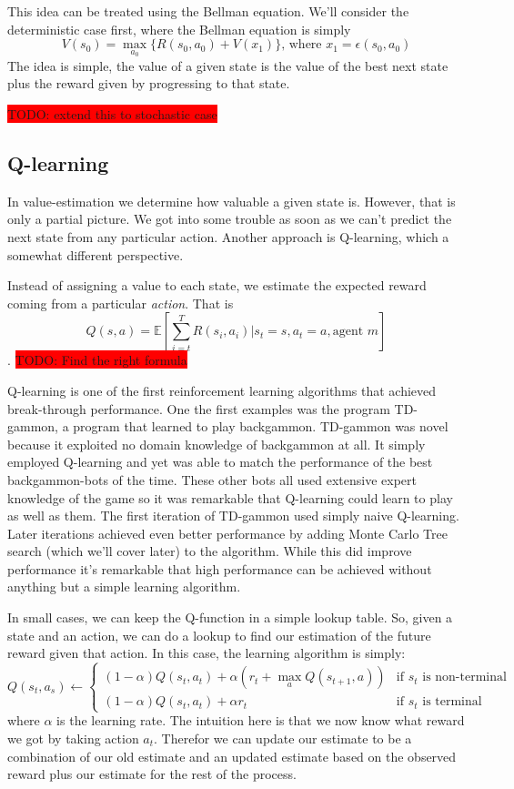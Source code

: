 \documentclass{article}
\theoremstyle{changedot}
\theoremstyle{changedotbreak}
\theoremstyle{nonumberplain}
\begin{document}
This idea can be treated using the Bellman equation. We'll consider the deterministic case first, where the Bellman equation is simply
\[V(s_{0}) = \max_{a_{0}} \{R(s_{0}, a_{0}) + V(x_{1}) \} \text{, where } x_{1} = \epsilon(s_{0}, a_{0})\]
The idea is simple, the value of a given state is the value of the best next state plus the reward given by progressing to that state. 

\colorbox{red}{TODO: extend this to stochastic case}

\subsection{Q-learning}
In value-estimation we determine how valuable a given state is. However, that is only a partial picture. We got into some trouble as soon as we can't predict the next state from any particular action. Another approach is Q-learning, which a somewhat different perspective.

Instead of assigning a value to each state, we estimate the expected reward coming from a particular \emph{action}. That is
\[Q(s, a) = \mathbb{E}[\sum_{i=t}^{T} R(s_{i}, a_{i}) | s_{t}=s, a_{t}=a, \text{agent } m]\].
\colorbox{red}{TODO: Find the right formula}

Q-learning is one of the first reinforcement learning algorithms that achieved break-through performance. One the first examples was the program TD-gammon, a program that learned to play backgammon. TD-gammon was novel because it exploited no domain knowledge of backgammon at all. It simply employed Q-learning and yet was able to match the performance of the best backgammon-bots of the time. These other bots all used extensive expert knowledge of the game so it was remarkable that Q-learning could learn to play as well as them. The first iteration of TD-gammon used simply naive Q-learning. Later iterations achieved even better performance by adding Monte Carlo Tree search (which we'll cover later) to the algorithm. While this did improve performance it's remarkable that high performance can be achieved without anything but a simple learning algorithm.

In small cases, we can keep the Q-function in a simple lookup table. So, given a state and an action, we can do a lookup to find our estimation of the future reward given that action. In this case, the learning algorithm is simply:
\[Q(s_{t}, a_{s}) \leftarrow \begin{cases} (1 - \alpha)Q(s_{t}, a_{t}) + \alpha (r_{t} + \max_{a} Q(s_{t+1}, a)) & \text{if  $s_{t}$ is non-terminal} \\ (1 - \alpha) Q(s_{t}, a_{t}) + \alpha r_{t} & \text{if $s_{t}$ is terminal} \end{cases}\]
where $\alpha$ is the learning rate. The intuition here is that we now know what reward we got by taking action $a_{t}$. Therefor we can update our estimate to be a combination of our old estimate and an updated estimate based on the observed reward plus our estimate for the rest of the process.
\end{document}

